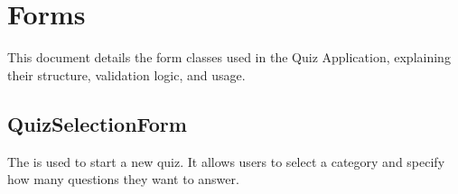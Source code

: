\documentclass[letterpaper,10pt,english]{sphinxmanual}
\begin{document}
\sphinxstepscope


\section{Forms}
\label{\detokenize{forms:forms}}\label{\detokenize{forms::doc}}
\sphinxAtStartPar
This document details the form classes used in the Quiz Application, explaining their structure, validation logic, and usage.


\subsection{QuizSelectionForm}
\label{\detokenize{forms:quizselectionform}}
\sphinxAtStartPar
The  is used to start a new quiz. It allows users to select a category and specify how many questions they want to answer.
\end{document}
